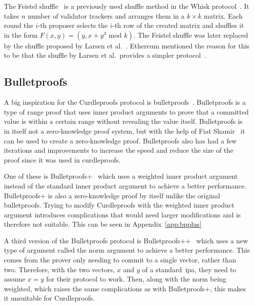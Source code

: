 The Feistel shuffle~\cite{Feistle} is a previously used shuffle method in the Whisk protocol~\cite{Whisk2024}.
It takes $n$ number of validator trackers and arranges them in a $k\times k$ matrix.
Each round the $i$-th proposer selects the $i$-th row of the created matrix and shuffles it in the form $F(x,y)=(y,x+y^3\text{ mod }k)$.
The Feistel shuffle was later replaced by the shuffle proposed by Larsen et al.~\cite{cryptoeprint:2022/560}.
Ethereum mentioned the reason for this to be that the shuffle by Larsen et al.\ provides a simpler protocol~\cite{Whisk2024}.

\subsection{Bulletproofs}\label{subsec:related-work-bulletproofs}
A big inspiration for the Curdleproofs protocol is bulletproofs~\cite{bunz2018bulletproofs}.
Bulletproofs is a type of range proof that uses inner product arguments to prove that a committed value is within a certain range without revealing the value itself.
Bulletproofs is in itself not a zero-knowledge proof system, but with the help of Fiat Shamir~\cite{bunz2018bulletproofs} it can be used to create a zero-knowledge proof.
Bulletproofs also has had a few iterations and improvements to increase the speed and reduce the size of the proof since it was used in curdleproofs.

One of these is Bulletproofs+~\cite{chung2022bulletproofs+} which uses a weighted inner product argument instead of the standard inner product argument to achieve a better performance.
Bulletproofs+ is also a zero-knowledge proof by itself unlike the original bulletproofs.
Trying to modify Curdleproofs with the weighted inner product argument introduces complications that would need larger modifications and is therefore not suitable.
This can be seen in Appendix~\autoref{app:bpplus}

A third version of the Bulletproofs protocol is Bulletproofs++~\cite{eagen2024bulletproofs++} which uses a new type of argument called the norm argument to achieve a better performance.
This comes from the prover only needing to commit to a single vector, rather than two.
Therefore, with the two vectors, $x$ and $y$ of a standard~\gls{ipa}, they need to assume $x=y$ for their protocol to work.
Then, along with the norm being weighted, which raises the same complications as with Bulletproofs+, this makes it unsuitable for Curdleproofs.